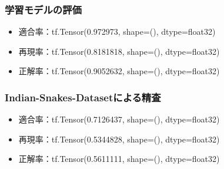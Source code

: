\documentclass[a4paper, 11pt, titlepage]{jsarticle}
\begin{document}
\subsubsection{学習モデルの評価}
\begin{itemize}
\item 適合率：tf.Tensor(0.972973, shape=(), dtype=float32)
\item 再現率：tf.Tensor(0.8181818, shape=(), dtype=float32) 
\item 正解率：tf.Tensor(0.9052632, shape=(), dtype=float32)
\end{itemize}
\subsubsection{Indian-Snakes-Datasetによる精査}
\begin{itemize}
\item 適合率：tf.Tensor(0.7126437, shape=(), dtype=float32)
\item 再現率：tf.Tensor(0.5344828, shape=(), dtype=float32) 
\item 正解率：tf.Tensor(0.5611111, shape=(), dtype=float32)
\end{itemize}

\clearpage
\end{document}

